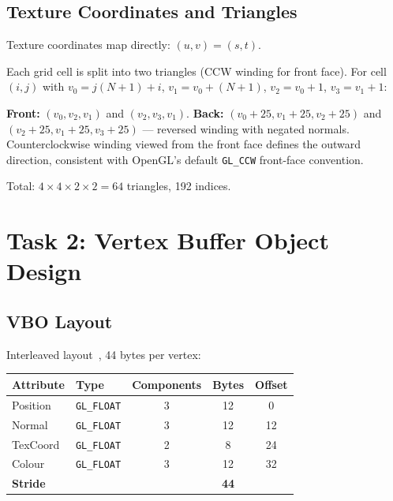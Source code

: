 \documentclass[11pt,a4paper]{article}
\begin{document}
\subsection{Texture Coordinates and Triangles}

Texture coordinates map directly: $(u,v) = (s,t)$.

Each grid cell is split into two triangles (CCW winding for front face).
For cell $(i,j)$ with $v_0 = j(N{+}1)+i$,
$v_1 = v_0 + (N{+}1)$, $v_2 = v_0 + 1$, $v_3 = v_1 + 1$:

\textbf{Front:} $(v_0, v_2, v_1)$ and $(v_2, v_3, v_1)$.
\textbf{Back:} $(v_0{+}25, v_1{+}25, v_2{+}25)$ and $(v_2{+}25, v_1{+}25, v_3{+}25)$
--- reversed winding with negated normals.
Counterclockwise winding viewed from the front face defines the outward
direction, consistent with OpenGL's default \texttt{GL\_CCW} front-face convention.

Total: $4 \times 4 \times 2 \times 2 = 64$ triangles, 192 indices.


\section{Task 2: Vertex Buffer Object Design}

\subsection{VBO Layout}

Interleaved layout~\cite[Ch.~3]{redbook}, 44 bytes per vertex:

\begin{center}
\begin{tabular}{llccc}
\toprule
\textbf{Attribute} & \textbf{Type} & \textbf{Components} & \textbf{Bytes} & \textbf{Offset} \\
\midrule
Position & \texttt{GL\_FLOAT} & 3 & 12 &  0 \\
Normal   & \texttt{GL\_FLOAT} & 3 & 12 & 12 \\
TexCoord & \texttt{GL\_FLOAT} & 2 &  8 & 24 \\
Colour   & \texttt{GL\_FLOAT} & 3 & 12 & 32 \\
\midrule
\multicolumn{3}{l}{\textbf{Stride}} & \textbf{44} & \\
\bottomrule
\end{tabular}
\end{center}
\end{document}
